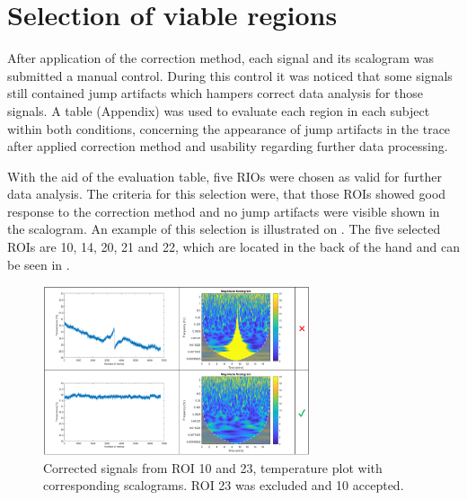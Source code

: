 \section{Selection of viable regions}

After application of the correction method, each signal and its scalogram was submitted a manual control. During this control it was noticed that some signals still contained jump artifacts which hampers correct data analysis for those signals. A table (Appendix) was used to evaluate each region in each subject within both conditions, concerning the appearance of jump artifacts in the trace after applied correction method and usability regarding further data processing.

With the aid of the evaluation table, five RIOs were chosen as valid for further data analysis. The criteria for this selection were, that those ROIs showed good response to the correction method and no jump artifacts were visible shown in the scalogram. An example of this selection is illustrated on . The five selected ROIs are 10, 14, 20, 21 and 22, which are located in the back of the hand and can be seen in .

\begin{figure}[H]
	\includegraphics[width=0.7\textwidth]{figures/ROI_selection}
	\caption{Corrected signals from ROI 10 and 23, temperature plot with corresponding scalograms. ROI 23 was excluded and 10 accepted.}
	\label{fig:selection}
\end{figure} 
